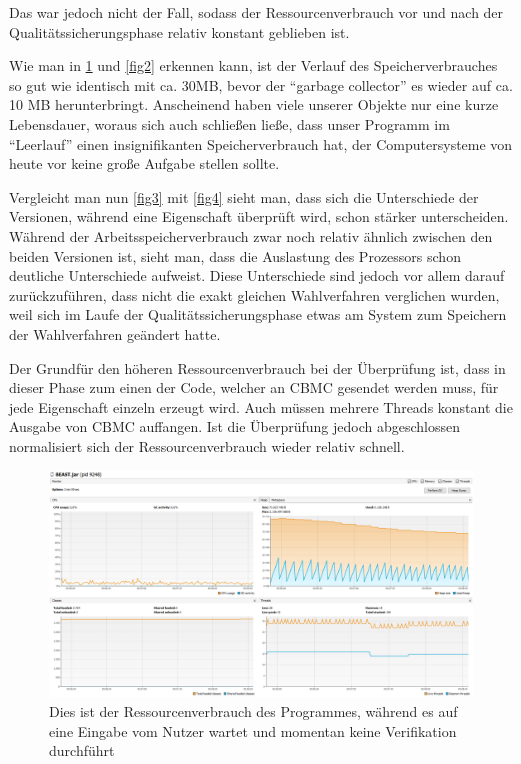 \documentclass[a4paper]{scrreprt}
\begin{document}
Das war jedoch nicht der Fall, sodass der Ressourcenverbrauch vor und nach der
Qualitätssicherungsphase relativ konstant geblieben ist.

Wie man in \ref{fig1} und \ref{fig2} erkennen kann, ist der Verlauf des
Speicherverbrauches so gut wie identisch mit ca. 30MB, bevor der "`garbage
collector"' es wieder auf ca. 10 MB herunterbringt. Anscheinend haben viele
unserer Objekte nur eine kurze Lebensdauer, woraus sich auch schließen ließe,
dass unser Programm im "`Leerlauf"' einen insignifikanten Speicherverbrauch hat,
der Computersysteme von heute vor keine große Aufgabe stellen sollte.

Vergleicht man nun \ref{fig3} mit \ref{fig4} sieht man, dass sich die
Unterschiede der Versionen, während eine Eigenschaft überprüft wird, schon
stärker unterscheiden. Während der Arbeitsspeicherverbrauch zwar noch relativ
ähnlich zwischen den beiden Versionen ist, sieht man, dass die Auslastung des
Prozessors schon deutliche Unterschiede aufweist. Diese Unterschiede sind jedoch vor allem darauf
zurückzuführen, dass nicht die exakt gleichen Wahlverfahren verglichen
wurden, weil sich im Laufe der Qualitätssicherungsphase etwas am System zum
Speichern der Wahlverfahren geändert hatte.

Der Grundfür den höheren Ressourcenverbrauch bei der Überprüfung ist, dass in dieser Phase zum einen der Code, welcher an CBMC gesendet
werden muss, für jede Eigenschaft einzeln erzeugt wird. Auch müssen mehrere Threads
konstant die Ausgabe von CBMC auffangen.
Ist die Überprüfung jedoch abgeschlossen normalisiert sich der
Ressourcenverbrauch wieder relativ schnell.

\newpage
\begin{figure}[ht]
	\centering
  \includegraphics[width=1.0\textwidth,
  height=0.40\textwidth]{images/OLD_NO.png} \caption{Dies ist der
  Ressourcenverbrauch des Programmes, während es auf eine Eingabe vom Nutzer wartet und momentan keine Verifikation durchführt}
	\label{fig1}
\end{figure}
\end{document}
